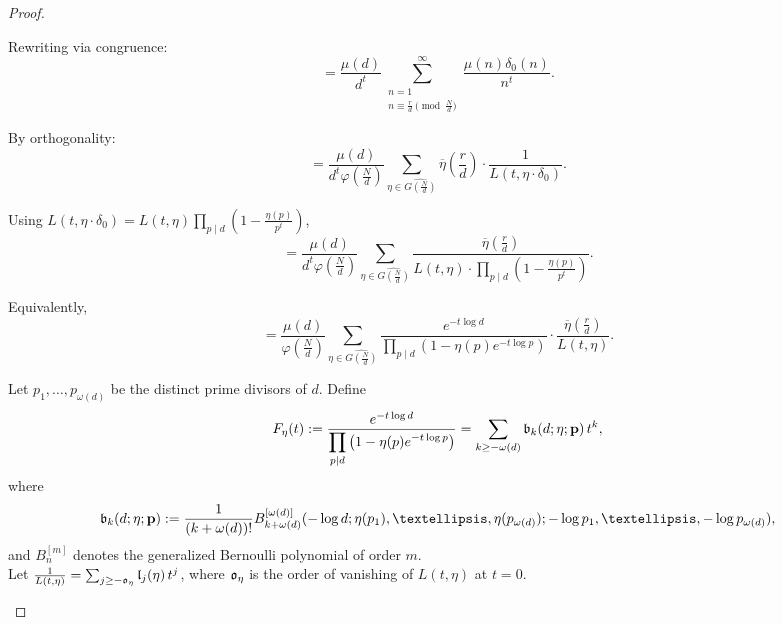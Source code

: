 \documentclass[10pt,a4paper]{amsart}
\begin{document}
\begin{proof}
\begin{enumerate}[label= \roman*)]
Rewriting via congruence:
\begin{equation*}
= \frac{\mu(d)}{d^t} \sum_{\substack{n=1 \\ n \equiv \frac{r}{d}\pmod{\frac{N}{d}}}}^\infty \frac{\mu(n) \delta_0(n)}{n^t}.
\end{equation*}


By orthogonality:
\begin{equation*}
= \frac{\mu(d)}{d^t \varphi\left( \frac{N}{d} \right)} \sum_{\eta \in \widehat{G\left( \frac{N}{d} \right)}} \overline{\eta}\left( \frac{r}{d} \right) \cdot \frac{1}{L(t, \eta \cdot \delta_0)}.
\end{equation*}


Using $L(t, \eta \cdot \delta_0) = L(t, \eta) \prod_{p \mid d} \left( 1 - \frac{\eta(p)}{p^t} \right)$,
\begin{equation*}
= \frac{\mu(d)}{d^t \varphi\left( \frac{N}{d} \right)} \sum_{\eta \in \widehat{G\left( \frac{N}{d} \right)}} \frac{ \overline{\eta}\left( \frac{r}{d} \right) }{ L(t, \eta) \cdot \displaystyle\prod_{p \mid d} \left( 1 - \frac{\eta(p)}{p^t} \right) }.
\end{equation*}


Equivalently,
\begin{equation*}
= \frac{\mu(d)}{\varphi\left( \frac{N}{d} \right)} \sum_{\eta \in \widehat{G\left( \frac{N}{d} \right)}} \frac{ e^{-t \log d} }{ \displaystyle\prod_{p \mid d} \left( 1 - \eta(p) e^{-t \log p} \right) } \cdot \frac{ \overline{\eta}\left( \frac{r}{d} \right) }{ L(t, \eta) }.
\end{equation*}


Let $p_1, \dots, p_{\omega(d)}$ be the distinct prime divisors of $d$. Define
\begin{equation*}
F_\eta(t) := \frac{ e^{-t \log d} }{ \displaystyle\prod_{p \mid d} \left( 1 - \eta(p) e^{-t \log p} \right) } = \sum_{k \geq -\omega(d)} \frak{b}_k(d; \eta; \mathbf{p}) \, t^k,
\end{equation*}
where
\begin{equation*}
\frak{b}_k(d; \eta; \mathbf{p}) := \frac{1}{(k + \omega(d))!} 
B_{k+\omega(d)}^{[\omega(d)]}(-\log d; \eta(p_1), \dots, \eta(p_{\omega(d)}); -\log p_1, \dots, -\log p_{\omega(d)}),
\end{equation*}
and $B_n^{[m]}$ denotes the generalized Bernoulli polynomial of order $m$.\\


Let $\frac{1}{L(t, \eta)} = \sum_{j \geq -\frak{o}_\eta} \frak{l}_j(\eta) \, t^j$, where $\frak{o}_\eta$ is the order of vanishing of $L(t,\eta)$ at $t=0$.



\end{enumerate}
\end{proof}
\end{document}
